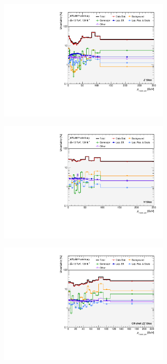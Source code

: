 \begin{figure}[hp]
    \centering
    \begin{subfigure}{.49\textwidth}\centering\includegraphics[width = 0.95\textwidth]{Figures/m4l/Systematics/Unfolded/UnfoldedSys_pt12_vs_M4l_Stack_Paper0.pdf}\end{subfigure}
    \begin{subfigure}{.49\textwidth}\centering\includegraphics[width = 0.95\textwidth]{Figures/m4l/Systematics/Unfolded/UnfoldedSys_pt12_vs_M4l_Stack_Paper1.pdf}\end{subfigure}
    \begin{subfigure}{.49\textwidth}\centering\includegraphics[width = 0.95\textwidth]{Figures/m4l/Systematics/Unfolded/UnfoldedSys_pt12_vs_M4l_Stack_Paper2.pdf}\end{subfigure}

\end{figure}
